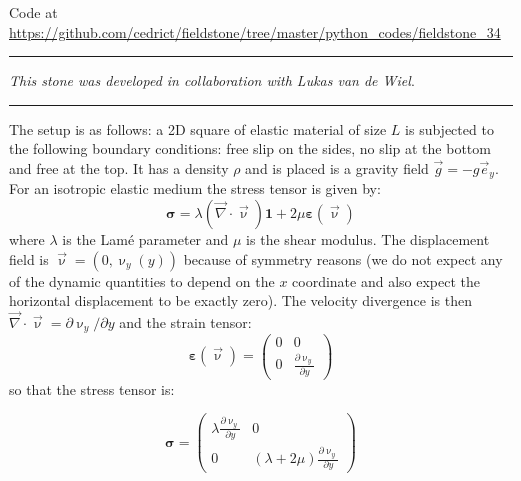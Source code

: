 

\begin{center}
Code at \url{https://github.com/cedrict/fieldstone/tree/master/python_codes/fieldstone_34}
\end{center}

\par\noindent\rule{\textwidth}{0.4pt}

{\sl This stone was developed in collaboration with Lukas van de Wiel}.

\par\noindent\rule{\textwidth}{0.4pt}


The setup is as follows: a 2D square of elastic material of size $L$ is 
subjected to the following boundary conditions: free slip on the sides, no slip at the 
bottom and free at the top. It has a density $\rho$ and is placed is a gravity 
field ${\vec g}=-g {\vec e}_y$.
For an isotropic elastic medium the stress tensor is given by:
\[
{\bm \sigma} = \lambda ({\vec \nabla}\cdot{\vec \upnu}) {\bm 1} + 2 \mu {\bm \varepsilon}(\vec\upnu)
\]
where $\lambda$ is the Lam{\'e} parameter and $\mu$ is the shear modulus.
The displacement field is ${\vec \upnu}=(0,\upnu_y(y))$ because of symmetry reasons 
(we do not expect any of the dynamic quantities to depend on the $x$ coordinate and 
also expect the horizontal displacement to be exactly zero).
The velocity divergence is then ${\vec \nabla}\cdot{\vec \upnu} = \partial \upnu_y/\partial y$
and the strain tensor:
\[
{\bm \varepsilon}(\vec \upnu)
=
\left(
\begin{array}{cc}
0 & 0 \\
0 & \frac{\partial \upnu_y}{\partial y}
\end{array}
\right)
\]
so that the stress tensor is:

\[
{\bm \sigma} =
\left(
\begin{array}{cc}
\lambda \frac{\partial \upnu_y}{\partial y} &  0 \\
0 & (\lambda + 2 \mu) \frac{\partial \upnu_y}{\partial y}
\end{array}
\right)
\]

